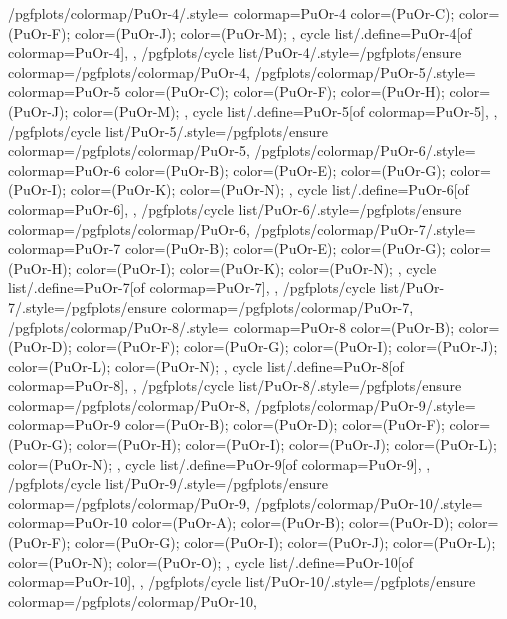 {  %
  /pgfplots/colormap/PuOr-4/.style={
    colormap={PuOr-4}{
      color=(PuOr-C);
      color=(PuOr-F);
      color=(PuOr-J);
      color=(PuOr-M);
    },
    cycle list/.define={PuOr-4}{[of colormap=PuOr-4]},
  },
  /pgfplots/cycle list/PuOr-4/.style={/pgfplots/ensure colormap={/pgfplots/colormap/PuOr-4}},
  /pgfplots/colormap/PuOr-5/.style={
    colormap={PuOr-5}{
      color=(PuOr-C);
      color=(PuOr-F);
      color=(PuOr-H);
      color=(PuOr-J);
      color=(PuOr-M);
    },
    cycle list/.define={PuOr-5}{[of colormap=PuOr-5]},
  },
  /pgfplots/cycle list/PuOr-5/.style={/pgfplots/ensure colormap={/pgfplots/colormap/PuOr-5}},
  /pgfplots/colormap/PuOr-6/.style={
    colormap={PuOr-6}{
      color=(PuOr-B);
      color=(PuOr-E);
      color=(PuOr-G);
      color=(PuOr-I);
      color=(PuOr-K);
      color=(PuOr-N);
    },
    cycle list/.define={PuOr-6}{[of colormap=PuOr-6]},
  },
  /pgfplots/cycle list/PuOr-6/.style={/pgfplots/ensure colormap={/pgfplots/colormap/PuOr-6}},
  /pgfplots/colormap/PuOr-7/.style={
    colormap={PuOr-7}{
      color=(PuOr-B);
      color=(PuOr-E);
      color=(PuOr-G);
      color=(PuOr-H);
      color=(PuOr-I);
      color=(PuOr-K);
      color=(PuOr-N);
    },
    cycle list/.define={PuOr-7}{[of colormap=PuOr-7]},
  },
  /pgfplots/cycle list/PuOr-7/.style={/pgfplots/ensure colormap={/pgfplots/colormap/PuOr-7}},
  /pgfplots/colormap/PuOr-8/.style={
    colormap={PuOr-8}{
      color=(PuOr-B);
      color=(PuOr-D);
      color=(PuOr-F);
      color=(PuOr-G);
      color=(PuOr-I);
      color=(PuOr-J);
      color=(PuOr-L);
      color=(PuOr-N);
    },
    cycle list/.define={PuOr-8}{[of colormap=PuOr-8]},
  },
  /pgfplots/cycle list/PuOr-8/.style={/pgfplots/ensure colormap={/pgfplots/colormap/PuOr-8}},
  /pgfplots/colormap/PuOr-9/.style={
    colormap={PuOr-9}{
      color=(PuOr-B);
      color=(PuOr-D);
      color=(PuOr-F);
      color=(PuOr-G);
      color=(PuOr-H);
      color=(PuOr-I);
      color=(PuOr-J);
      color=(PuOr-L);
      color=(PuOr-N);
    },
    cycle list/.define={PuOr-9}{[of colormap=PuOr-9]},
  },
  /pgfplots/cycle list/PuOr-9/.style={/pgfplots/ensure colormap={/pgfplots/colormap/PuOr-9}},
  /pgfplots/colormap/PuOr-10/.style={
    colormap={PuOr-10}{
      color=(PuOr-A);
      color=(PuOr-B);
      color=(PuOr-D);
      color=(PuOr-F);
      color=(PuOr-G);
      color=(PuOr-I);
      color=(PuOr-J);
      color=(PuOr-L);
      color=(PuOr-N);
      color=(PuOr-O);
    },
    cycle list/.define={PuOr-10}{[of colormap=PuOr-10]},
  },
  /pgfplots/cycle list/PuOr-10/.style={/pgfplots/ensure colormap={/pgfplots/colormap/PuOr-10}},
}
